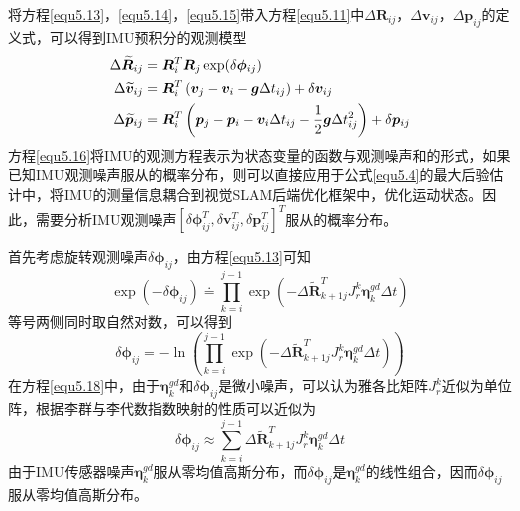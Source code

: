 将方程\eqref{equ5.13}，\eqref{equ5.14}，\eqref{equ5.15}带入方程\eqref{equ5.11}中$\Delta \boldsymbol{R}_{ij}$，$\Delta \boldsymbol{v}_{ij}$，$\Delta \boldsymbol{p}_{ij}$的定义式，可以得到IMU预积分的观测模型
\begin{equation}
\label{equ5.16}
\begin{aligned}
\Delta \widetilde{\boldsymbol{R}}_{ij} &= \boldsymbol{R}_i^T \boldsymbol{R}_j \exp(\delta \boldsymbol{\phi}_{ij} ) 
\\ 
\Delta \widetilde{\boldsymbol{v}}_{ij} &= \boldsymbol{R}_i^T \left(\boldsymbol{v}_j-\boldsymbol{v}_i-\boldsymbol{g}\Delta t_{ij} \right)+\delta \boldsymbol{v}_{ij} 
\\
\Delta \widetilde{\boldsymbol{p}}_{ij} &= \boldsymbol{R}_i^T \left( \boldsymbol{p}_j-\boldsymbol{p}_i-\boldsymbol{v}_i \Delta t_{ij} -{1 \over 2} \boldsymbol{g} \Delta t_{ij}^2 \right) + \delta \boldsymbol{p}_{ij}
\end{aligned}
\end{equation}
方程\eqref{equ5.16}将IMU的观测方程表示为状态变量的函数与观测噪声和的形式，如果已知IMU观测噪声服从的概率分布，则可以直接应用于公式\eqref{equ5.4}的最大后验估计中，将IMU的测量信息耦合到视觉SLAM后端优化框架中，优化运动状态。因此，需要分析IMU观测噪声$[\delta \boldsymbol{\phi}_{ij}^T,\delta \boldsymbol{v}_{ij}^T,\delta \boldsymbol{p}_{ij}^T]^T$服从的概率分布。

首先考虑旋转观测噪声$\delta \boldsymbol{\phi}_{ij}$，由方程\eqref{equ5.13}可知
\begin{equation}
\label{equ5.17}
\exp \left( -\delta \boldsymbol{\phi}_{ij} \right) \doteq \prod\limits_{k=i}^{j-1} \exp \left( -\Delta \widetilde{\boldsymbol{R}}_{k+1j}^T  J_r^k \boldsymbol{\eta}_k^{gd} \Delta t  \right)
\end{equation}
等号两侧同时取自然对数，可以得到
\begin{equation}
\label{equ5.18}
\delta \boldsymbol{\phi}_{ij} = -\ln \left( \prod\limits_{k=i}^{j-1} \exp \left( -\Delta \widetilde{\boldsymbol{R}}_{k+1j}^T  J_r^k \boldsymbol{\eta}_k^{gd} \Delta t \right) \right)
\end{equation}
在方程\eqref{equ5.18}中，由于$\boldsymbol{\eta}_k^{gd}$和$\delta \boldsymbol{\phi}_{ij}$是微小噪声，可以认为雅各比矩阵$J_r^k$近似为单位阵，根据李群与李代数指数映射的性质可以近似为
\begin{equation}
\label{equ5.19}
\delta \boldsymbol{\phi}_{ij} \approx \sum\limits_{k=i}^{j-1} \Delta \widetilde{\boldsymbol{R}}_{k+1j}^T  J_r^k \boldsymbol{\eta}_k^{gd} \Delta t
\end{equation}
由于IMU传感器噪声$\boldsymbol{\eta}_k^{gd}$服从零均值高斯分布，而$\delta \boldsymbol{\phi}_{ij}$是$\boldsymbol{\eta}_k^{gd}$的线性组合，因而$\delta \boldsymbol{\phi}_{ij}$服从零均值高斯分布。

